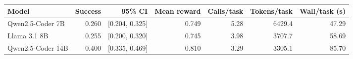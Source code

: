 \begin{tabular}{lrrrrrr}
\toprule
Model & Success & 95\% CI & Mean reward & Calls/task & Tokens/task & Wall/task (s) \\
\midrule
Qwen2.5-Coder 7B & 0.260 & [0.204, 0.325] & 0.749 & 5.28 & 6429.4 & 47.29 \\
Llama 3.1 8B & 0.255 & [0.200, 0.320] & 0.745 & 3.98 & 3707.7 & 58.69 \\
Qwen2.5-Coder 14B & 0.400 & [0.335, 0.469] & 0.810 & 3.29 & 3305.1 & 85.70 \\
\bottomrule
\end{tabular}
